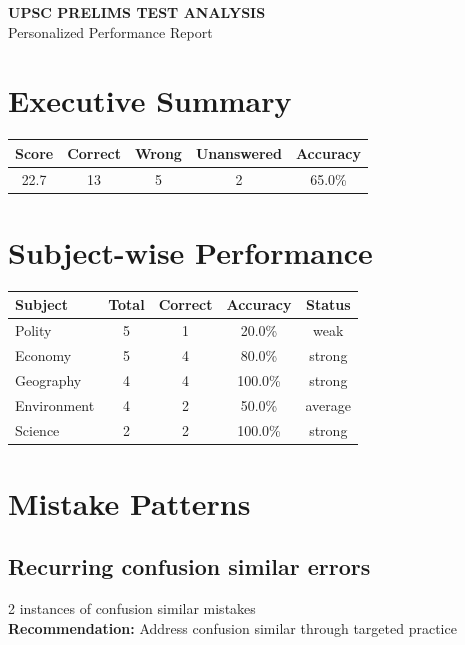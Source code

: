\documentclass[a4paper,12pt]{article}
\begin{document}
\begin{center}
\vspace*{1cm}
{\Huge\bfseries\color{brandblue} UPSC PRELIMS TEST ANALYSIS}\\[0.5cm]
{\Large\color{black} Personalized Performance Report}\\[1cm]
\end{center}
\section{Executive Summary}
\begin{center}
\begin{tabular}{|c|c|c|c|c|}
\hline
\textbf{Score} & \textbf{Correct} & \textbf{Wrong} & \textbf{Unanswered} & \textbf{Accuracy} \\
\hline
22.7 & 13 & 5 & 2 & 65.0\% \\
\hline
\end{tabular}
\end{center}
\section{Subject-wise Performance}
\begin{center}
\begin{tabular}{|l|c|c|c|c|}
\hline
\textbf{Subject} & \textbf{Total} & \textbf{Correct} & \textbf{Accuracy} & \textbf{Status} \\
\hline
Polity & 5 & 1 & \textcolor{wrongred}{20.0\%} & weak \\
\hline
Economy & 5 & 4 & \textcolor{correctgreen}{80.0\%} & strong \\
\hline
Geography & 4 & 4 & \textcolor{correctgreen}{100.0\%} & strong \\
\hline
Environment & 4 & 2 & \textcolor{brandgold}{50.0\%} & average \\
\hline
Science & 2 & 2 & \textcolor{correctgreen}{100.0\%} & strong \\
\hline
\end{tabular}
\end{center}
\section{Mistake Patterns}
\subsection*{Recurring confusion similar errors}
2 instances of confusion similar mistakes\\
\textbf{Recommendation:} Address confusion similar through targeted practice\\
\end{document}
